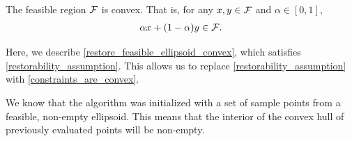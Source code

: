\begin{assumption}
\label{constraints_are_convex}
The feasible region ${\mathcal F}$ is convex.
That is, for any $x,y \in {\mathcal F}$ and $\alpha \in[0, 1]$,
\begin{align*}
\alpha x + (1- \alpha) y \in {\mathcal F}.
\end{align*}
\end{assumption}
Here, we describe \cref{restore_feasible_ellipsoid_convex}, which satisfies \cref{restorability_assumption}.
This allows us to replace \cref{restorability_assumption} with \cref{constraints_are_convex}.



We know that the algorithm was initialized with a set of sample points from a feasible, non-empty ellipsoid.
This means that the interior of the convex hull of previously evaluated points will be non-empty.


%             
% 

